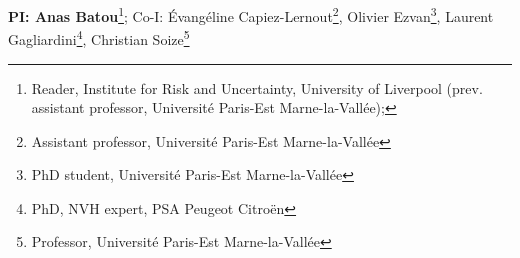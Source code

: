 \documentclass[11pt]{article}%
\begin{document}




































\cleardoublepage

\thispagestyle{Academic}

\begin{minipage}[t]{.99\linewidth} %
\hypertarget{Anas}{}

\end{minipage}

{\bf PI: Anas Batou}\footnote{Reader, Institute for Risk and Uncertainty, University of Liverpool (prev. assistant professor, Universit{\'e} Paris-Est Marne-la-Vall{\'e}e);
}; Co-I: {\'E}vangéline Capiez-Lernout\footnote{Assistant professor, Universit{\'e} Paris-Est Marne-la-Vall{\'e}e}, Olivier Ezvan\footnote{PhD student, Universit{\'e} Paris-Est Marne-la-Vall{\'e}e}, Laurent Gagliardini\footnote{PhD, NVH expert, PSA Peugeot Citro{\"e}n}, Christian Soize\footnote{Professor, Universit{\'e} Paris-Est Marne-la-Vall{\'e}e}%
\end{document}
